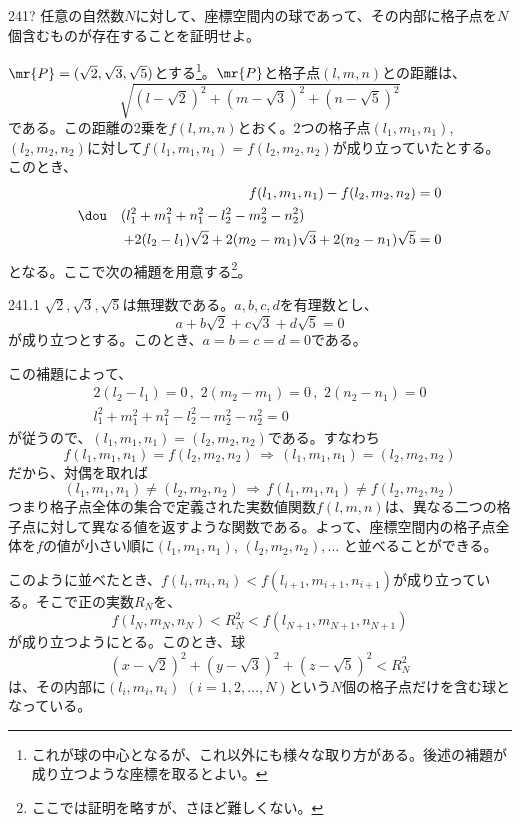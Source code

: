 \begin{prob}{241}{\hosi ?}{}
 任意の自然数$N$に対して、座標空間内の球であって、その内部に格子点を$N$個含むものが存在することを証明せよ。
\end{prob}

$\mr{P}=(\sqrt{2}, \sqrt{3}, \sqrt{5})$とする\footnote{これが球の中心となるが、これ以外にも様々な取り方がある。後述の補題が成り立つような座標を取るとよい。}。$\mr{P}$と格子点$(l,m,n)$との距離は、
\[ \sqrt{(l-\sqrt{2})^2+(m-\sqrt{3})^2+(n-\sqrt{5})^2} \]
である。この距離の2乗を$f(l,m,n)$とおく。2つの格子点$(l_1,m_1,n_1)$, $(l_2,m_2,n_2)$に対して$f(l_1,m_1,n_1)=f(l_2,m_2,n_2)$が成り立っていたとする。このとき、
\begin{align*}
 f(l_1,m_1,n_1)-f(l_2,m_2,n_2)&=0 \\
 \dou\quad (l_1^2+m_1^2+n_1^2-l_2^2-m_2^2-n_2^2) \qquad\qquad\qquad\qquad & \\
  + 2(l_2-l_1)\sqrt{2}+2(m_2-m_1)\sqrt{3}+2(n_2-n_1)\sqrt{5}&=0
\end{align*}
となる。ここで次の補題を用意する\footnote{ここでは証明を略すが、さほど難しくない。}。
\begin{subthm}{241.1}
 $\sqrt{2}, \sqrt{3}, \sqrt{5}$は無理数である。$a, b, c, d$を有理数とし、
 \[ a+b\sqrt{2}+c\sqrt{3}+d\sqrt{5}=0 \]
 が成り立つとする。このとき、$a=b=c=d=0$である。
\end{subthm}
この補題によって、
\begin{align*}
 2(l_2-l_1)=0 \,,\,\, 2(m_2-m_1)=0 \,,\,\, 2(n_2-n_1)=0 \\
 l_1^2+m_1^2+n_1^2-l_2^2-m_2^2-n_2^2=0
\end{align*}
が従うので、$(l_1, m_1, n_1)=(l_2, m_2, n_2)$である。すなわち
\[ f(l_1, m_1, n_1)=f(l_2, m_2, n_2) \,\Rightarrow\, (l_1, m_1, n_1)=(l_2, m_2, n_2) \]
だから、対偶を取れば
\[ (l_1, m_1, n_1)\neq (l_2, m_2, n_2) \,\Rightarrow\, f(l_1, m_1, n_1)\neq f(l_2, m_2, n_2) \]
つまり格子点全体の集合で定義された実数値関数$f(l,m,n)$は、異なる二つの格子点に対して異なる値を返すような関数である。よって、座標空間内の格子点全体を$f$の値が小さい順に$(l_1, m_1, n_1)$, $(l_2, m_2, n_2), \ldots$ と並べることができる。

このように並べたとき、$f(l_i, m_i, n_i) < f(l_{i+1}, m_{i+1}, n_{i+1})$が成り立っている。そこで正の実数$R_N$を、
\[ f(l_N, m_N, n_N) < R_N^2 < f(l_{N+1}, m_{N+1}, n_{N+1}) \]
が成り立つようにとる。このとき、球
\[ (x-\sqrt{2})^2+(y-\sqrt{3})^2+(z-\sqrt{5})^2 < R_N^2 \]
は、その内部に$(l_i, m_i, n_i)$ $(i=1,2,\dots,N)$という$N$個の格子点だけを含む球となっている。